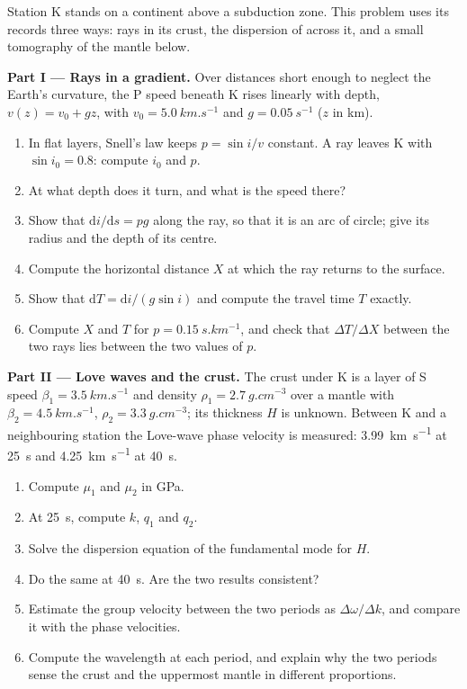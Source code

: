 \begin{problem}
\label{pb:b3:seismology-imaging:1}
Station K stands on a continent above a subduction zone. This problem uses its
records three ways: rays in its crust, the dispersion of  across it,
and a small tomography of the mantle below.

\medskip
\noindent\textbf{Part I --- Rays in a gradient.} Over distances short enough to
neglect the Earth's curvature, the P speed beneath K rises linearly with depth,
$v(z) = v_0 + gz$, with $v_0 = \qty{5.0}{km.s^{-1}}$ and
$g = \qty{0.05}{s^{-1}}$ ($z$ in km).
\begin{enumerate}
  \item In flat layers, Snell's law keeps $p = \sin i/v$ constant. A ray leaves
        K with $\sin i_0 = 0.8$: compute $i_0$ and $p$.
  \item At what depth does it turn, and what is the speed there?
  \item Show that $\mathrm di/\mathrm ds = pg$ along the ray, so that it is an
        arc of circle; give its radius and the depth of its centre.
  \item Compute the horizontal distance $X$ at which the ray returns to the
        surface.
  \item Show that $\mathrm dT = \mathrm di/(g\sin i)$ and compute the travel
        time $T$ exactly.
  \item Compute $X$ and $T$ for $p = \qty{0.15}{s.km^{-1}}$, and check that
        $\Delta T/\Delta X$ between the two rays lies between the two values
        of $p$.
\end{enumerate}

\noindent\textbf{Part II --- Love waves and the crust.} The crust under K is a
layer of S speed $\beta_1 = \qty{3.5}{km.s^{-1}}$ and density
$\rho_1 = \qty{2.7}{g.cm^{-3}}$ over a mantle with $\beta_2 =
\qty{4.5}{km.s^{-1}}$, $\rho_2 = \qty{3.3}{g.cm^{-3}}$; its thickness $H$ is
unknown. Between K and a neighbouring station the Love-wave phase velocity is
measured: \qty{3.99}{km.s^{-1}} at \qty{25}{s} and \qty{4.25}{km.s^{-1}} at
\qty{40}{s}.
\begin{enumerate}[resume]
  \item Compute $\mu_1$ and $\mu_2$ in \unit{GPa}.
  \item At \qty{25}{s}, compute $k$, $q_1$ and $q_2$.
  \item Solve the dispersion equation of the fundamental mode for $H$.
  \item Do the same at \qty{40}{s}. Are the two results consistent?
  \item Estimate the group velocity between the two periods as
        $\Delta\omega/\Delta k$, and compare it with the phase velocities.
  \item Compute the wavelength at each period, and explain why the two
        periods sense the crust and the uppermost mantle in different
        proportions.
\end{enumerate}


\end{problem}
